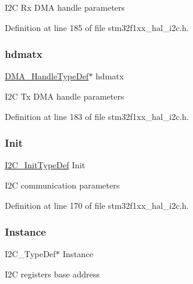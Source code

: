 I2C Rx D\+MA handle parameters 

Definition at line 185 of file stm32f1xx\+\_\+hal\+\_\+i2c.\+h.

\mbox{\label{struct_i2_c___handle_type_def_a33e13c28b1a70e6164417abb026d7a22}} 
\subsubsection{\texorpdfstring{hdmatx}{hdmatx}}
{\footnotesize\ttfamily \hyperlink{group___d_m_a___exported___types_ga92b907d56a9c29b93d46782a7a04f91e}{D\+M\+A\+\_\+\+Handle\+Type\+Def}$\ast$ hdmatx}

I2C Tx D\+MA handle parameters 

Definition at line 183 of file stm32f1xx\+\_\+hal\+\_\+i2c.\+h.

\mbox{\label{struct_i2_c___handle_type_def_a4b1d65e692a280d15470a8184ed2f68a}} 
\subsubsection{\texorpdfstring{Init}{Init}}
{\footnotesize\ttfamily \hyperlink{struct_i2_c___init_type_def}{I2\+C\+\_\+\+Init\+Type\+Def} Init}

I2C communication parameters 

Definition at line 170 of file stm32f1xx\+\_\+hal\+\_\+i2c.\+h.

\mbox{\label{struct_i2_c___handle_type_def_a8bdec20782b6b99587806437094c43d2}} 
\subsubsection{\texorpdfstring{Instance}{Instance}}
{\footnotesize\ttfamily I2\+C\+\_\+\+Type\+Def$\ast$ Instance}

I2C registers base address 

